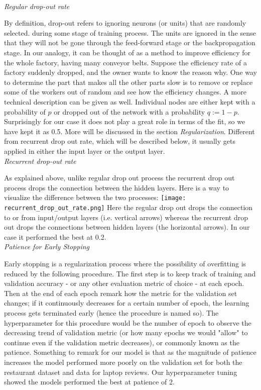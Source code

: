 \documentclass[comsoc,conference]{IEEEtran}
\begin{document}
\\ \emph{Regular drop-out rate}
\par By definition, drop-out refers to ignoring neurons (or units) that are randomly selected. during some stage of training process. The units are ignored in the sense that they will not be gone through the feed-forward stage or the backpropagation stage. In our analogy, it can be thought of as a method to improve efficiency for the whole factory, having many conveyor belts. Suppose the efficiency rate of a factory suddenly dropped, and the owner wants to know the reason why. One way to determine the part that makes all the other parts slow is to remove or replace some of the workers out of random and see how the efficiency changes. A more technical description can be given as well. Individual nodes are either kept with a probability of $p$ or dropped out of the network with a probability $q:= 1-p$. Surprisingly for our case it does not play a great role in terms of the fit, so we have kept it as 0.5. More will be discussed in the section \textit{Regularization}. Different from recurrent drop out rate, which will be described below, it usually gets applied in either the input layer or the output layer. %
\\ \emph{Recurrent drop-out rate}
\par As explained above, unlike regular drop out process the recurrent drop out process drops the connection between the hidden layers. Here is a way to visualize the difference between the two processes:
\texttt{[image: recurrent\_drop\_out\_rate.png]}
Here the regular drop out drops the connection to or from input/output layers (i.e. vertical arrows) whereas the recurrent drop out drops the connections between hidden layers (the horizontal arrows). In our case it performed the best at 0.2.
\\ \emph{Patience for Early Stopping}
\par Early stopping is a regularization process where the possibility of overfitting is reduced by the following procedure.
The first step is to keep track of training and validation accuracy - or any other evaluation metric of choice - at each epoch. Then at the end of each epoch remark how the metric for the validation set changes; if it continuously decreases for a certain number of epoch, the learning process gets terminated early (hence the procedure is named so). The hyperparameter for this procedure would be the number of epoch to observe the decreasing trend of validation metric (or how many epochs we would "allow" to continue even if the validation metric decreases), or commonly known as the patience. Something to remark for our model is that as the magnitude of patience increases the model performed more poorly on the validation set for both the restaurant dataset and data for laptop reviews. Our hyperparameter tuning showed the models performed the best at patience of 2.
\end{document}
